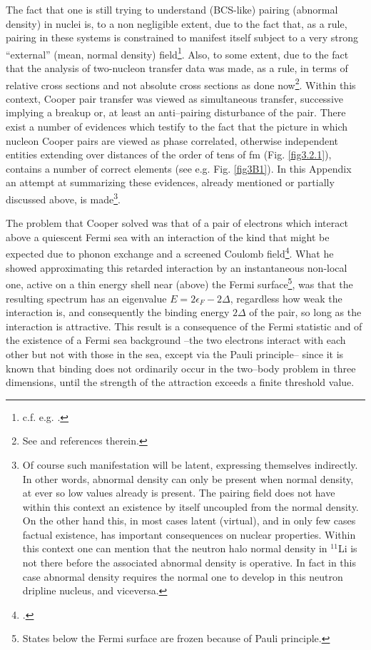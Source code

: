 \begin{subappendices}
The fact that one is still trying to understand (BCS-like) pairing (abnormal   density) in nuclei is, to a non negligible extent, due to the fact that, as a rule, pairing in these systems is constrained to manifest itself subject to a very strong ``external'' (mean, normal density) field\footnote{c.f. e.g. \cite{Matsuo:13}.}. Also, to some extent, due to the fact that the analysis of two-nucleon transfer data was made, as a rule, in terms of relative cross sections and not absolute cross sections as done now\footnote{See \cite{Potel:13} and references therein.}. Within this context, Cooper pair transfer was viewed as simultaneous transfer, successive implying a breakup or, at least an anti--pairing disturbance of the pair. There exist a number of evidences which testify to the fact that the picture in which nucleon Cooper pairs are viewed as phase correlated, otherwise independent  entities extending over distances of the order of tens of fm (Fig. \ref{fig3.2.1}), contains a number of correct elements (see e.g. Fig. \ref{fig3B1}). In this Appendix an attempt at summarizing these evidences, already mentioned or partially discussed above, is made\footnote{Of course such manifestation will be latent, expressing themselves indirectly. In other words, abnormal density can only be present when normal density, at ever so low values already is present. The pairing field does not have within this context an existence by itself uncoupled from the normal density. On the other hand this, in most cases latent (virtual), and in only few cases factual existence, has important consequences on nuclear properties. Within this context one can mention that the neutron halo normal density in $^{11}$Li is not there before the associated abnormal density is operative. In fact in this case abnormal density requires the normal one to develop in this neutron dripline nucleus, and viceversa.}.


 The problem that Cooper solved was that of a pair of electrons which interact above a quiescent Fermi sea with  an interaction of the kind that might be expected due to  phonon exchange and a screened Coulomb field\footnote{\cite{Cooper:56}.}. What he showed approximating this retarded interaction by an instantaneous non-local one, active on a thin energy shell near (above) the Fermi surface\footnote{States below the Fermi surface are frozen because of Pauli principle.}, was that the resulting spectrum has an eigenvalue $E=2\epsilon_F-2\Delta$, regardless how weak the interaction is, and consequently the binding energy $2\Delta$ of the pair, so long as the interaction is attractive. This result is a consequence of the Fermi statistic and of the existence of a Fermi sea background --the two electrons interact with each other but not with those in the sea, except via the Pauli principle-- since it is  known that binding does not ordinarily occur in the two--body problem in three dimensions, until the strength of the attraction exceeds a finite threshold value.


\end{subappendices}
